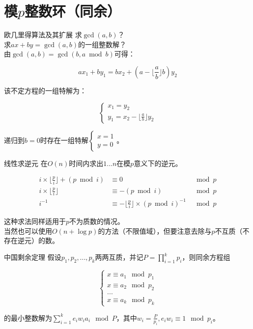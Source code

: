 \documentclass{beamer}
\begin{document}
	\section{模$p$整数环（同余）}
\begin{frame}{欧几里得算法及其扩展}
	求$\gcd(a,b)$？
	\pause\\
	
	求$ax+by=\gcd(a,b)$的一组整数解？
	\pause\\
	
	由$\gcd(a,b)=\gcd(b,a \bmod b)$可得：
	
	$$ax_1+by_1=bx_2+(a-\lfloor\frac{a}{b}\rfloor b)y_2$$
	
	该不定方程的一组特解为：
	
	$$\begin{cases}
		x_1=y_2\\
		y_1=x_2-\lfloor\frac{a}{b}\rfloor y_2
	\end{cases}$$
	
	递归到$b=0$时存在一组特解$\begin{cases}x=1\\y=0\end{cases}$。
\end{frame}
\begin{frame}{线性求逆元}
	在$O(n)$时间内求出$1...n$在模$p$意义下的逆元。
	
	$$\begin{aligned}
		i\times \lfloor\frac{p}{i}\rfloor + (p \bmod i) &\equiv 0 &\mod p\\
		i\times \lfloor\frac{p}{i}\rfloor &\equiv -(p \bmod i) &\mod p\\
		i^{-1} &\equiv -\lfloor\frac{p}{i}\rfloor \times (p \bmod i)^{-1} &\mod p 
	\end{aligned}$$
	
	这种求法同样适用于$p$不为质数的情况。
	\\
	
	当然也可以使用$O(n+\log p)$的方法（不限值域），但要注意去除与$p$不互质（不存在逆元）的数。
\end{frame}
\begin{frame}{中国剩余定理}
	假设$p_1,p_2,...,p_k$两两互质，并记$P=\prod\limits_{i=1}^kp_i$，则同余方程组
	
	$$\begin{cases}
		x \equiv a_1 \mod p_1\\
		x \equiv a_2 \mod p_2\\
		...\\
		x \equiv a_k \mod p_k
	\end{cases}$$
	
	的最小整数解为$\sum\limits_{i=1}^ke_iw_ia_i \mod P$，其中$w_i=\frac{P}{p_i}, e_iw_i \equiv 1 \mod p_i$。
\end{frame}
\end{document}
